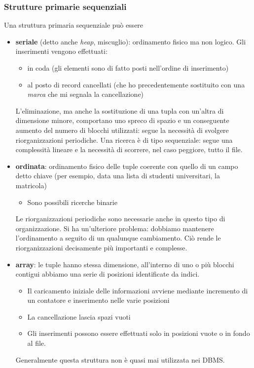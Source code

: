 \subsubsection{Strutture primarie sequenziali} Una struttura primaria sequenziale può essere
\begin{itemize}
	\item \textbf{seriale} (detto anche \emph{heap}, miscuglio): ordinamento fisico ma non logico. Gli inserimenti vengono effettuati:
	\begin{itemize}
		\item in coda (gli elementi sono di fatto posti nell'ordine di inserimento)
		\item al posto di record cancellati (che ho precedentemente sostituito con una \emph{marca} che mi segnala la cancellazione)
	\end{itemize}
	L'eliminazione, ma anche la sostituzione di una tupla con un'altra di dimensione minore, comportano uno spreco di spazio e un conseguente aumento del numero di blocchi utilizzati: segue la necessità di svolgere riorganizzazioni periodiche. Una ricerca è di tipo sequenziale: segue una complessità lineare e la necessità di scorrere, nel caso peggiore, tutto il file.
	\item \textbf{ordinata}: ordinamento fisico delle tuple coerente con quello di un campo detto chiave (per esempio, data una lista di studenti universitari, la matricola)
	\begin{itemize}
		\item Sono possibili ricerche binarie
	\end{itemize}
	Le riorganizzazioni periodiche sono necessarie anche in questo tipo di organizzazione. Si ha un'ulteriore problema: dobbiamo mantenere l'ordinamento a seguito di un qualunque cambiamento. Ciò rende le riorganizzazioni decisamente più importanti e complesse.
	\item \textbf{array}: le tuple hanno stessa dimensione, all'interno di uno o più blocchi contigui abbiamo una serie di posizioni identificate da indici. 
	\begin{itemize}
		\item Il caricamento iniziale delle informazioni avviene mediante incremento di un contatore e inserimento nelle varie posizioni
		\item La cancellazione lascia spazi vuoti
		\item Gli inserimenti possono essere effettuati solo in posizioni vuote o in fondo al file. 
	\end{itemize}
	Generalmente questa struttura non è quasi mai utilizzata nei DBMS. 
\end{itemize}
